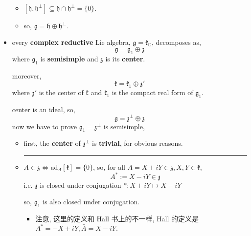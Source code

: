 \begin{itemize}
\begin{tcolorbox}[title=proof:]
\begin{itemize}
			\item $[\mathfrak{h}, \mathfrak{h}^\perp] \subseteq \mathfrak{h} \cap \mathfrak{h}^\perp = \{0\}$.
			
			\item so, $\mathfrak{g} = \mathfrak{h} \oplus \mathfrak{h}^\perp$.
		\end{itemize}
	\end{tcolorbox}
	
	\item every \textbf{complex reductive} Lie algebra, $\mathfrak{g} = \mathfrak{k}_\mathbb{C}$, decomposes as,
	\begin{equation} \label{6.1.6}
		\mathfrak{g} = \mathfrak{g}_1 \oplus \mathfrak{z}
	\end{equation}
	where $\mathfrak{g}_1$ is \textbf{semisimple} and $\mathfrak{z}$ is its \textbf{center}.
	
	moreover,
	\begin{equation}
		\mathfrak{k} = \mathfrak{k}_1 \oplus \mathfrak{z}'
	\end{equation}
	where $\mathfrak{z}'$ is the center of $\mathfrak{k}$ and $\mathfrak{k}_1$ is the compact real form of $\mathfrak{g}_1$.
	
	\begin{tcolorbox}[title=proof:]
		center is an ideal, so,
		\begin{equation}
			\mathfrak{g} = \mathfrak{z}^\perp \oplus \mathfrak{z}
		\end{equation}
		now we have to prove $\mathfrak{g}_1 = \mathfrak{z}^\perp$ is semisimple,
		\begin{itemize}
			\item first, the \textbf{center} of $\mathfrak{z}^\perp$ is \textbf{trivial}, for obvious reasons.
			
			\noindent\rule[0.5ex]{\linewidth}{0.5pt} %
			
			\item $A \in \mathfrak{z} \iff \mathrm{ad}_A[\mathfrak{k}] = \{0\}$, so, for all $A = X + i Y \in \mathfrak{z}, X, Y \in \mathfrak{k}$,
			\begin{equation}
				A^* := X - i Y \in \mathfrak{z}
			\end{equation}
			i.e. $\mathfrak{z}$ is closed under conjugation $* : X + i Y \mapsto X - i Y$
			
			so, $\mathfrak{g}_1$ is also closed under conjugation.
			\begin{itemize}
				\item 注意, 这里的定义和 Hall 书上的不一样, Hall 的定义是 $A^* = - X + i Y, \bar{A} = X - i Y$.
			\end{itemize}
			

\end{itemize}
\end{tcolorbox}
\end{itemize}
